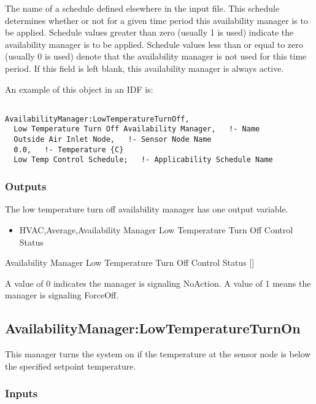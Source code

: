 The name of a schedule defined elsewhere in the input file. This schedule determines whether or not for a given time period this availability manager is to be applied. Schedule values greater than zero (usually 1 is used) indicate the availability manager is to be applied. Schedule values less than or equal to zero (usually 0 is used) denote that the availability manager is not used for this time period. If this field is left blank, this availability manager is always active.

An example of this object in an IDF is:

\begin{lstlisting}

AvailabilityManager:LowTemperatureTurnOff,
  Low Temperature Turn Off Availability Manager,   !- Name
  Outside Air Inlet Node,   !- Sensor Node Name
  0.0,   !- Temperature {C}
  Low Temp Control Schedule;   !- Applicability Schedule Name
\end{lstlisting}

\subsubsection{Outputs}\label{outputs-6-010}

The low temperature turn off availability manager has one output variable.

\begin{itemize}
\tightlist
\item
  HVAC,Average,Availability Manager Low Temperature Turn Off Control Status
\end{itemize}

Availability Manager Low Temperature Turn Off Control Status {[]}

A value of 0 indicates the manager is signaling NoAction. A value of 1 means the manager is signaling ForceOff.

\subsection{AvailabilityManager:LowTemperatureTurnOn}\label{availabilitymanagerlowtemperatureturnon}

This manager turns the system on if the temperature at the sensor node is below the specified setpoint temperature.

\subsubsection{Inputs}\label{inputs-8-025}

